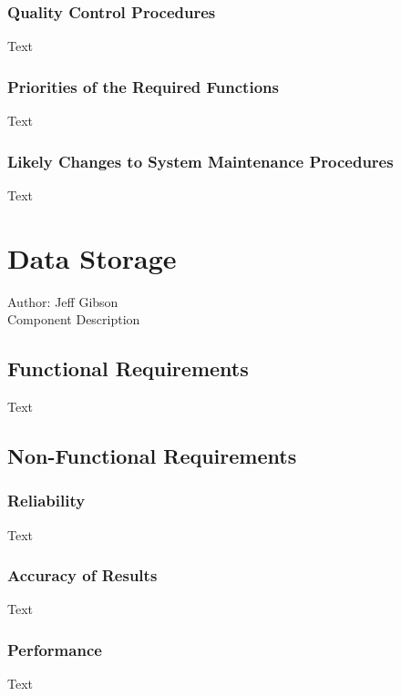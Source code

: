 \documentclass[12pt]{article}
\begin{document}
\subsubsection {Quality Control Procedures}

Text

\subsubsection {Priorities of the Required Functions}

Text

\subsubsection {Likely Changes to System Maintenance Procedures}

Text

\section{Data Storage}
Author: Jeff Gibson\\

\noindent Component Description

\subsection{Functional Requirements}

Text

\subsection{Non-Functional Requirements}

\subsubsection {Reliability}

Text

\subsubsection {Accuracy of Results}

Text

\subsubsection {Performance}

Text
\end{document}
